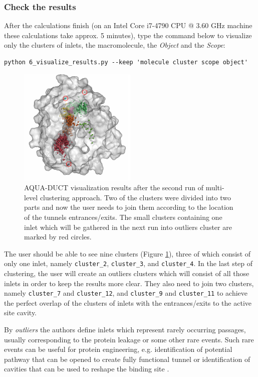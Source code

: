 \documentclass[9pt,tutorial, pubversion]{livecoms}
\begin{document}
\subsubsection{Check the results}
After the calculations finish (on an Intel Core i7-4790 CPU @ 3.60 GHz machine these calculations take approx. 5 minutes), type the command below to visualize only the clusters of inlets, the macromolecule, the \emph{Object} and the \emph{Scope}:
\begin{lstlisting}[columns=fullflexible]
python 6_visualize_results.py --keep 'molecule cluster scope object'
\end{lstlisting}

\begin{figure}[ht!]
\centering
\includegraphics[width=0.5\textwidth]{Tut2.2.png}
\caption{AQUA-DUCT visualization results after the second run of multi-level clustering approach. Two of the clusters were divided into two parts and now the user needs to join them according to the location of the tunnels entrances/exits. The small clusters containing one inlet which will be gathered in the next run into outliers cluster are marked by red circles.}
\label{Tut2.2}
\end{figure}

The user should be able to see nine clusters (Figure \ref{Tut2.2}), three of which consist of only one inlet, namely \texttt{cluster\_2}, \texttt{cluster\_3}, and \texttt{cluster\_4}. In the last step of clustering, the user will create an outliers clusters which will consist of all those inlets in order to keep the results more clear. They also need to join two clusters, namely \texttt{cluster\_7} and \texttt{cluster\_12}, and \texttt{cluster\_9} and \texttt{cluster\_11} to achieve the perfect overlap of the clusters of inlets with the entrances/exits to the active site cavity.

By \textit{outliers} the authors define inlets which represent rarely occurring passages, usually corresponding to the protein leakage or some other rare events. Such rare events can be useful for protein engineering, e.g. identification of potential pathway that can be opened to create fully functional tunnel \cite{Magdziarz2020,Brezovsky2016} or identification of cavities that can be used to reshape the binding site \cite{Mitusinska2018}.
\end{document}
